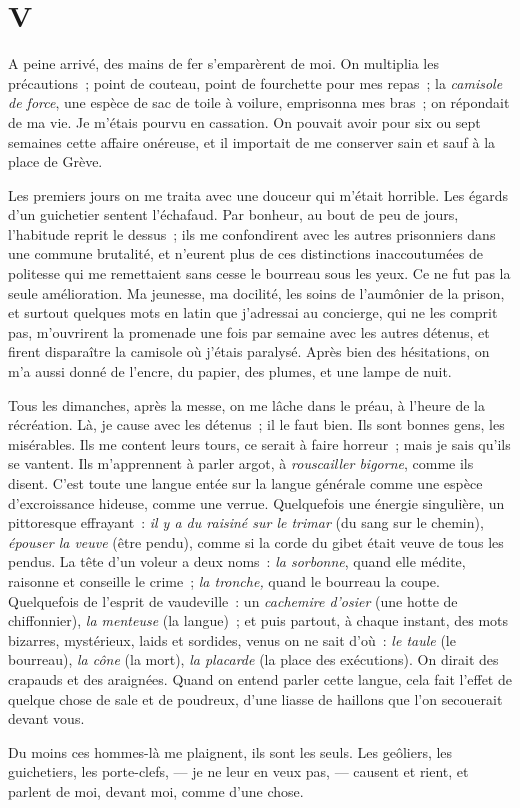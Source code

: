 \documentclass[french,twoside]{book} %
\begin{document}
 \section[{V}]{V}
\label{ch5}\renewcommand{\leftmark}{V}

\noindent A peine arrivé, des mains de fer s’emparèrent de moi. On multiplia les précautions ; point de couteau, point de fourchette pour mes repas ; la \emph{camisole de force}, une espèce de sac de toile à voilure, emprisonna mes bras ; on répondait de ma vie. Je m’étais pourvu en cassation. On pouvait avoir pour six ou sept semaines cette affaire onéreuse, et il importait de me conserver sain et sauf à la place de Grève.\par
Les premiers jours on me traita avec une douceur qui m’était horrible. Les égards d’un guichetier sentent l’échafaud. Par bonheur, au bout de peu de jours, l’habitude reprit le dessus ; ils me confondirent avec les autres prisonniers dans une commune brutalité, et n’eurent plus de ces distinctions inaccoutumées de politesse qui me remettaient sans cesse le bourreau sous les yeux. Ce ne fut pas la seule amélioration. Ma jeunesse, ma docilité, les soins de l’aumônier de la prison, et surtout quelques mots en latin que j’adressai au concierge, qui ne les comprit pas, m’ouvrirent la promenade une fois par semaine avec les autres détenus, et firent disparaître la camisole où j’étais paralysé. Après bien des hésitations, on m’a aussi donné de l’encre, du papier, des plumes, et une lampe de nuit.\par
 Tous les dimanches, après la messe, on me lâche dans le préau, à l’heure de la récréation. Là, je cause avec les détenus ; il le faut bien. Ils sont bonnes gens, les misérables. Ils me content leurs tours, ce serait à faire horreur ; mais je sais qu’ils se vantent. Ils m’apprennent à parler argot, à \emph{rouscailler bigorne}, comme ils disent. C’est toute une langue entée sur la langue générale comme une espèce d’excroissance hideuse, comme une verrue. Quelquefois une énergie singulière, un pittoresque effrayant : \emph{il y a du raisiné sur le trimar }(du sang sur le chemin), \emph{épouser la veuve} (être pendu), comme si la corde du gibet était veuve de tous les pendus. La tête d’un voleur a deux noms : \emph{la sorbonne}, quand elle médite, raisonne et conseille le crime ; \emph{la tronche,} quand le bourreau la coupe. Quelquefois de l’esprit de vaudeville : un \emph{cachemire d’osier} (une hotte de chiffonnier), \emph{la menteuse} (la langue) ; et puis partout, à chaque instant, des mots bizarres, mystérieux, laids et sordides, venus on ne sait d’où : \emph{le taule} (le bourreau), \emph{la cône} (la mort), \emph{la placarde} (la place des exécutions). On dirait des crapauds et des araignées. Quand on entend parler cette langue, cela fait l’effet de quelque chose de sale et de poudreux, d’une liasse de haillons que l’on secouerait devant vous.\par
Du moins ces hommes-là me plaignent, ils sont les seuls. Les geôliers, les guichetiers, les porte-clefs, — je ne leur en veux pas, — causent et rient, et parlent de moi, devant moi, comme d’une chose.
\end{document}
